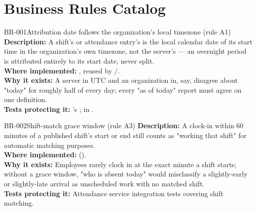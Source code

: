 \section{Business Rules Catalog}

\begin{businessrule}{BR-001}{Attribution date follows the organization's local timezone (rule A1)}
\textbf{Description:} A shift's or attendance entry's 
is the local calendar date of its start time in the organization's own
timezone, not the server's --- an overnight period is attributed
entirely to its start date, never split.\\
\textbf{Where implemented:} ,
reused by \allowbreak/.\\
\textbf{Why it exists:} A server in UTC and an organization in, say,
 disagree about "today" for roughly half of
every day; every "as of today" report must agree on one definition.\\
\textbf{Tests protecting it:} 's
;
in .
\end{businessrule}

\begin{businessrule}{BR-002}{Shift-match grace window (rule A3)}
\textbf{Description:} A clock-in within 60 minutes of a published
shift's start or end still counts as "working that shift" for
automatic matching purposes.\\
\textbf{Where implemented:} 
().\\
\textbf{Why it exists:} Employees rarely clock in at the exact minute a
shift starts; without a grace window, "who is absent today" would
misclassify a slightly-early or slightly-late arrival as unscheduled
work with no matched shift.\\
\textbf{Tests protecting it:} Attendance service integration tests
covering shift matching.
\end{businessrule}

